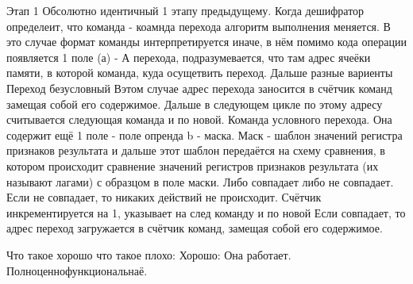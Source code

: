 \documentclass[12px]{article}
\begin{document}
Этап 1 
Обсолютно идентичный 1 этапу предыдущему. 
Когда дешифратор определеит, что команда - коамнда перехода алгоритм выполнения меняется. 
В это случае формат команды интерпретируется иначе, в нём помимо кода операции появляется 1 поле (а) - А перехода, подразумевается, что там адрес ячеёки памяти, в которой команда, куда осущетвить переход. Дальше разные вариенты 
Переход безусловный
Вэтом случае адрес перехода заносится в счётчик команд замещая собой его содержимое. Дальше в следующем цикле по этому адресу считывается следующая команда и по новой. 
Команда условного перехода. 
Она содержит ещё 1 поле - поле опренда b - маска. Маск - шаблон значений регистра признаков результата и дальше этот шаблон передаётся на схему сравнения, в котором происходит сравнение значений регистров признаков результата (их называют лагами) с образцом в поле маски. Либо совпадает либо не совпадает. Если не совпадает, то никаких действий не происходит. Счётчик инкрементируется на 1, указывает на след команду и по новой 
Если совпадает, то адрес переход загружается в счётчик команд, замещая собой его содержимое.



Что такое хорошо что такое плохо:
Хорошо: Она работает. Полноценнофункциональнаё. 

\fi 
\end{document}
